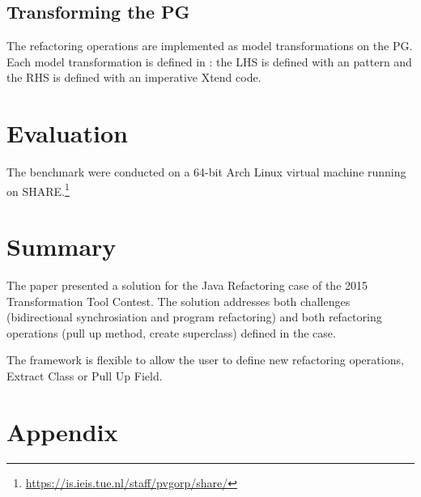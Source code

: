 \documentclass[submission,copyright,creativecommons]{eptcs}
\begin{document}
\subsection{Transforming the PG}

The refactoring operations are implemented as model transformations on the PG. Each model transformation is defined in \viatra: the LHS is defined with an \eiq pattern and the RHS is defined with an imperative Xtend code.

\section{Evaluation}

The benchmark were conducted on a 64-bit Arch Linux virtual machine running on SHARE.\footnote{\url{https://is.ieis.tue.nl/staff/pvgorp/share/}}


\section{Summary}

The paper presented a solution for the Java Refactoring case of the 2015 Transformation Tool Contest. The solution addresses both challenges (bidirectional synchrosiation and program refactoring) and both refactoring operations (pull up method, create superclass) defined in the case.

The framework is flexible to allow the user to define new refactoring operations, \eg \textsf{Extract Class} or \textsf{Pull Up Field}.




\clearpage

\appendix
\section{Appendix}


\end{document}
